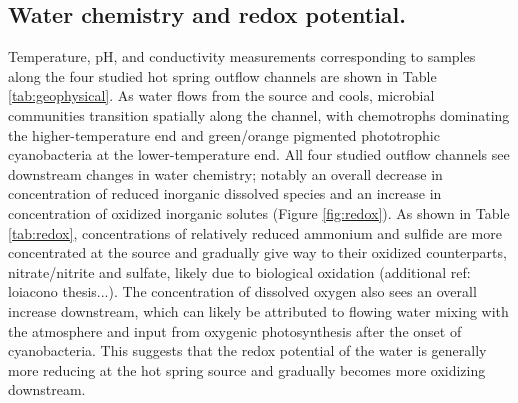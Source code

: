 \subsection{Water chemistry and redox potential.} Temperature, pH, and conductivity measurements corresponding to samples along the four studied hot spring outflow channels are shown in Table \ref{tab:geophysical}. As water flows from the source and cools, microbial communities transition spatially along the channel, with chemotrophs dominating the higher-temperature end and green/orange pigmented phototrophic cyanobacteria at the lower-temperature end. All four studied outflow channels see downstream changes in water chemistry; notably an overall decrease in concentration of reduced inorganic dissolved species and an increase in concentration of oxidized inorganic solutes (Figure \ref{fig:redox}). As shown in Table \ref{tab:redox}, concentrations of relatively reduced ammonium and sulfide are more concentrated at the source and gradually give way to their oxidized counterparts, nitrate/nitrite and sulfate, likely due to biological oxidation \citep{cox2011transition, loiacono2012evidence} (additional ref: loiacono thesis...). The concentration of dissolved oxygen also sees an overall increase downstream, which can likely be attributed to flowing water mixing with the atmosphere and input from oxygenic photosynthesis after the onset of cyanobacteria. This suggests that the redox potential of the water is generally more reducing at the hot spring source and gradually becomes more oxidizing downstream. 


